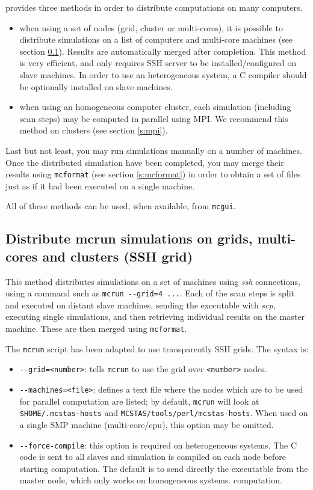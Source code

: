 \MCS provides three methods in order to distribute computations on many
computers.
\begin{itemize}
\item when using a set of nodes (grid, cluster or multi-cores), it is possible
  to distribute simulations on a list of computers and multi-core machines (see
  section \ref{s:ssh-grid}). Results are automatically merged after completion.
  This method is very efficient, and only requires SSH server to be
  installed/configured on slave machines.  In order to use an heterogeneous
  system, a C compiler should be optionally installed on slave machines.
\item when using an homogeneous computer cluster, each simulation (including
  scan steps) may be computed in parallel using MPI. We recommend this method on
  clusters (see section \ref{s:mpi}).
\end{itemize}

Last but not least, you may run simulations manually on a number of machines.
Once the distributed simulation have been completed, you may merge their results
using \verb+mcformat+ (see section \ref{s:mcformat})  in
order to obtain a set of files just as if it had been executed on a single
machine.

All of these methods can be used, when available, from \texttt{mcgui}.

\subsection{Distribute mcrun simulations on grids, multi-cores and clusters (SSH
  grid)}
\label{s:ssh-grid}
This method distributes simulations on a set of machines using \emph{ssh}
connections, using a command such as \verb+mcrun --grid=4 ...+.  Each of the
scan steps is split and executed on distant slave machines, sending the
executable with \emph{scp}, executing single simulations, and then retrieving
individual results on the master machine. These are then merged using
\texttt{mcformat}.

The \verb'mcrun' script has been adapted to use transparently SSH grids. The
syntax is:
\begin{itemize}
\item \verb'--grid=<number>': tells \verb'mcrun' to use the grid over \verb'<number>' nodes.
\item \verb'--machines=<file>': defines a text file where the nodes which are to
  be used for parallel computation are listed; by default, \verb'mcrun' will
  look at \verb'$HOME/.mcstas-hosts' and
  \verb'MCSTAS/tools/perl/mcstas-hosts'. When used on a single SMP machine
  (multi-core/cpu), this option may be omitted.
\item \verb'--force-compile': this option is required on heterogeneous systems.
  The C code is sent to all slaves and simulation is compiled on each node
  before starting computation. The default is to send directly the executatble
  from the master node, which only works on homogeneous systems.  computation.
\end{itemize}

